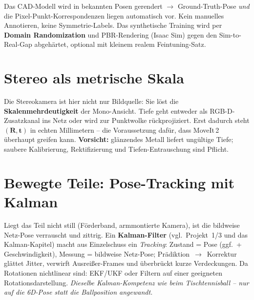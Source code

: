 \begin{infobox}[title=Labels sind quasi gratis]
Das CAD-Modell wird in bekannten Posen gerendert $\rightarrow$ Ground-Truth-Pose
\emph{und} die Pixel-Punkt-Korrespondenzen liegen automatisch vor. Kein manuelles
Annotieren, keine Symmetrie-Labels. Das synthetische Training wird per
\textbf{Domain Randomization} und PBR-Rendering (Isaac Sim) gegen den
Sim-to-Real-Gap abgehärtet, optional mit kleinem realem Feintuning-Satz.
\end{infobox}

\section{Stereo als metrische Skala}
Die Stereokamera ist hier nicht nur Bildquelle: Sie löst die
\textbf{Skalenmehrdeutigkeit} der Mono-Ansicht. Tiefe geht entweder als
RGB-D-Zusatzkanal ins Netz oder wird zur Punktwolke rückprojiziert. Erst dadurch
steht $(\bm{R},\bm{t})$ in echten Millimetern -- die Voraussetzung dafür, dass
MoveIt\,2 überhaupt greifen kann. \textbf{Vorsicht:} glänzendes Metall liefert
ungültige Tiefe; saubere Kalibrierung, Rektifizierung und Tiefen-Entrauschung
sind Pflicht.

\section{Bewegte Teile: Pose-Tracking mit Kalman}
Liegt das Teil nicht still (Förderband, armmontierte Kamera), ist die bildweise
Netz-Pose verrauscht und zittrig. Ein \textbf{Kalman-Filter} (vgl.\ Projekt~1/3
und das Kalman-Kapitel) macht aus Einzelschuss ein \emph{Tracking}: Zustand =
Pose (ggf.\ + Geschwindigkeit), Messung = bildweise Netz-Pose;
Prädiktion~$\rightarrow$~Korrektur glättet Jitter, verwirft Ausreißer-Frames und
überbrückt kurze Verdeckungen. Da Rotationen nichtlinear sind: EKF/UKF oder
Filtern auf einer geeigneten Rotationsdarstellung. \emph{Dieselbe
Kalman-Kompetenz wie beim Tischtennisball -- nur auf die 6D-Pose statt die
Ballposition angewandt.}


